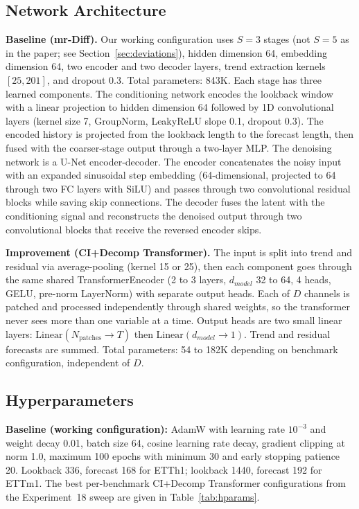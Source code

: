\documentclass[conference]{IEEEtran}
\begin{document}
\subsection{Network Architecture}
\textbf{Baseline (mr-Diff).} Our working configuration uses $S{=}3$ stages (not $S{=}5$ as in the paper; see Section~\ref{sec:deviations}), hidden dimension 64, embedding dimension 64, two encoder and two decoder layers, trend extraction kernels $[25, 201]$, and dropout 0.3. Total parameters: 843K. Each stage has three learned components. The conditioning network encodes the lookback window with a linear projection to hidden dimension 64 followed by 1D convolutional layers (kernel size 7, GroupNorm, LeakyReLU slope 0.1, dropout 0.3). The encoded history is projected from the lookback length to the forecast length, then fused with the coarser-stage output through a two-layer MLP. The denoising network is a U-Net encoder-decoder. The encoder concatenates the noisy input with an expanded sinusoidal step embedding (64-dimensional, projected to 64 through two FC layers with SiLU) and passes through two convolutional residual blocks while saving skip connections. The decoder fuses the latent with the conditioning signal and reconstructs the denoised output through two convolutional blocks that receive the reversed encoder skips.

\textbf{Improvement (CI+Decomp Transformer).} The input is split into trend and residual via average-pooling (kernel 15 or 25), then each component goes through the same shared TransformerEncoder (2 to 3 layers, $d_{model}$ 32 to 64, 4 heads, GELU, pre-norm LayerNorm) with separate output heads. Each of $D$ channels is patched and processed independently through shared weights, so the transformer never sees more than one variable at a time. Output heads are two small linear layers: $\mathrm{Linear}(N_{\text{patches}} \rightarrow T)$ then $\mathrm{Linear}(d_{model} \rightarrow 1)$. Trend and residual forecasts are summed. Total parameters: 54 to 182K depending on benchmark configuration, independent of $D$.

\subsection{Hyperparameters}
\textbf{Baseline (working configuration):} AdamW with learning rate $10^{-3}$ and weight decay 0.01, batch size 64, cosine learning rate decay, gradient clipping at norm 1.0, maximum 100 epochs with minimum 30 and early stopping patience 20. Lookback 336, forecast 168 for ETTh1; lookback 1440, forecast 192 for ETTm1. The best per-benchmark CI+Decomp Transformer configurations from the Experiment~18 sweep are given in Table~\ref{tab:hparams}.
\end{document}
